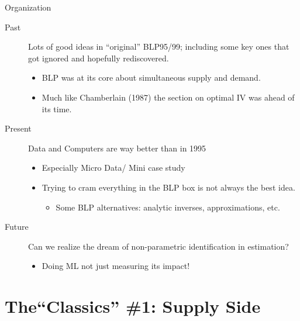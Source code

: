 \begin{frame}{Organization}
    \begin{description}
        \item[Past] Lots of good ideas in ``original'' BLP95/99; including some key ones that got ignored and hopefully rediscovered.
        \begin{itemize}
            \item BLP was at its core about \alert{simultaneous supply and demand}.
            \item Much like Chamberlain (1987) the section on optimal IV was ahead of its time.
        \end{itemize}
        \item[Present] Data and Computers are way better than in 1995
        \begin{itemize}
            \item Especially \alert{Micro Data}/ Mini case study
            \item Trying to cram everything in the BLP box is not always the best idea. 
            \begin{itemize}
                \item Some BLP alternatives: analytic inverses, approximations, etc.
            \end{itemize}
        \end{itemize}
        \item[Future] Can we realize the dream of \alert{non-parametric identification} in \alert{estimation}?
            \begin{itemize}
                \item Doing ML not just measuring its impact!
            \end{itemize}
    \end{description}
\end{frame}


\section*{The``Classics'' \#1: Supply Side}

